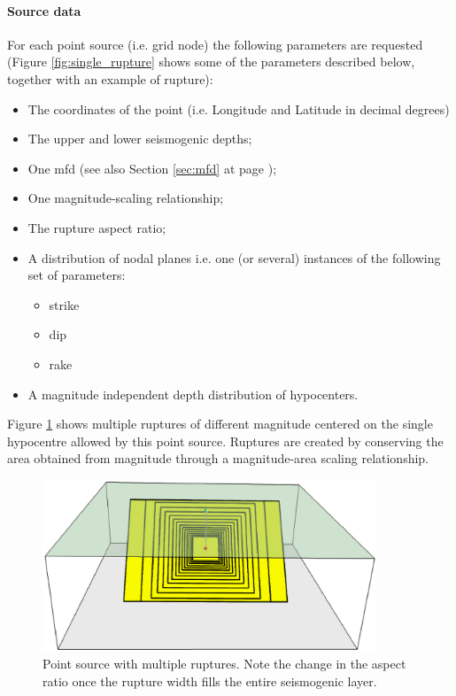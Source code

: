 \paragraph{Source data}
%
For each point source (i.e. grid node) the following parameters are requested
(Figure \ref{fig:single_rupture} shows some of the parameters described below, 
together with an example of rupture):
\begin{itemize}
\item The coordinates of the point (i.e. Longitude and Latitude in decimal 
    degrees)
\item The upper and lower seismogenic depths;
\item One \gls{mfd} (see also Section \ref{sec:mfd} at page 
    \pageref{sec:mfd});
\item One magnitude-scaling relationship;
\item The rupture aspect ratio;
\item A distribution of nodal planes i.e. one (or several) instances 
    of the following set of parameters:
\begin{itemize}
    \item \gls{strike}
    \item \gls{dip}
    \item \gls{rake}
\end{itemize}
\item A magnitude independent depth distribution of hypocenters. 
\end{itemize}
%
Figure \ref{fig:point_source_multiple_ruptures} shows multiple ruptures 
of different magnitude centered on the single hypocentre allowed 
by this point source. Ruptures are created by conserving the area obtained
from magnitude through a magnitude-area scaling relationship.
\begin{figure}[ht!]
\centering
\includegraphics[width=10cm]{./figures/hazard/point_source_multiple_ruptures.ps}
\caption{Point source with multiple ruptures. Note the change in the aspect 
ratio once the rupture width fills the entire seismogenic layer.}
\label{fig:point_source_multiple_ruptures}
\end{figure}
